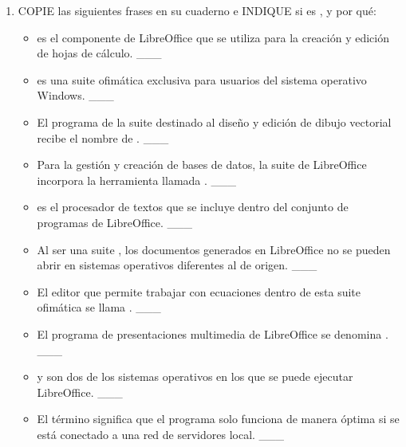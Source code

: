 \documentclass[letterpaper,10pt,spanish]{sphinxmanual}
\begin{document}
\begin{enumerate}
\begin{itemize}
\end{itemize}

\item {} 
\sphinxAtStartPar
COPIE las siguientes frases en su cuaderno e INDIQUE si es ,  y por qué:
\begin{itemize}
\item {} 
\sphinxAtStartPar
{} es el componente de LibreOffice que se utiliza para la creación y edición de hojas de cálculo. \_\_\_

\item {} 
\sphinxAtStartPar
{} es una suite ofimática exclusiva para usuarios del sistema operativo Windows. \_\_\_

\item {} 
\sphinxAtStartPar
El programa de la suite destinado al diseño y edición de dibujo vectorial recibe el nombre de . \_\_\_

\item {} 
\sphinxAtStartPar
Para la gestión y creación de bases de datos, la suite de LibreOffice incorpora la herramienta llamada . \_\_\_

\item {} 
\sphinxAtStartPar
{} es el procesador de textos que se incluye dentro del conjunto de programas de LibreOffice. \_\_\_

\item {} 
\sphinxAtStartPar
Al ser una suite , los documentos generados en LibreOffice no se pueden abrir en sistemas operativos
diferentes al de origen. \_\_\_

\item {} 
\sphinxAtStartPar
El editor que permite trabajar con ecuaciones dentro de esta suite ofimática se llama . \_\_\_

\item {} 
\sphinxAtStartPar
El programa de presentaciones multimedia de LibreOffice se denomina . \_\_\_

\item {} 
\sphinxAtStartPar
{} y  son dos de los sistemas operativos en los que se puede ejecutar LibreOffice. \_\_\_

\item {} 
\sphinxAtStartPar
El término  significa que el programa solo funciona de manera óptima si se está conectado a una red de servidores local. \_\_\_


\end{itemize}
\end{enumerate}
\end{document}
